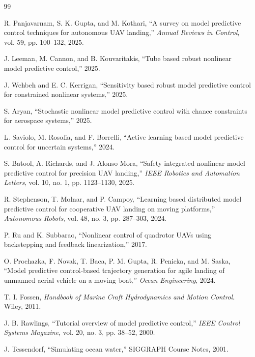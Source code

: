 \documentclass[12pt,a4paper]{report}
\begin{document}
\begin{thebibliography}{99}

R. Panjavarnam, S. K. Gupta, and M. Kothari,
``A survey on model predictive control techniques for autonomous UAV landing,''
\emph{Annual Reviews in Control}, vol. 59, pp. 100--132, 2025.

J. Leeman, M. Cannon, and B. Kouvaritakis,
``Tube based robust nonlinear model predictive control,''
2025.

J. Wehbeh and E. C. Kerrigan,
``Sensitivity based robust model predictive control for constrained nonlinear systems,''
2025.

S. Aryan,
``Stochastic nonlinear model predictive control with chance constraints for aerospace systems,''
2025.

L. Saviolo, M. Rosolia, and F. Borrelli,
``Active learning based model predictive control for uncertain systems,''
2024.

S. Batool, A. Richards, and J. Alonso-Mora,
``Safety integrated nonlinear model predictive control for precision UAV landing,''
\emph{IEEE Robotics and Automation Letters}, vol. 10, no. 1, pp. 1123--1130, 2025.

R. Stephenson, T. Molnar, and P. Campoy,
``Learning based distributed model predictive control for cooperative UAV landing on moving platforms,''
\emph{Autonomous Robots}, vol. 48, no. 3, pp. 287--303, 2024.

P. Ru and K. Subbarao,
``Nonlinear control of quadrotor UAVs using backstepping and feedback linearization,''
2017.

O. Prochazka, F. Novak, T. Baca, P. M. Gupta, R. Penicka, and M. Saska,
``Model predictive control-based trajectory generation for agile landing of unmanned aerial vehicle on a moving boat,''
\emph{Ocean Engineering}, 2024.

T. I. Fossen,
\emph{Handbook of Marine Craft Hydrodynamics and Motion Control}.
Wiley, 2011.

J. B. Rawlings,
``Tutorial overview of model predictive control,''
\emph{IEEE Control Systems Magazine}, vol. 20, no. 3, pp. 38--52, 2000.

J. Tessendorf,
``Simulating ocean water,''
SIGGRAPH Course Notes, 2001.

\end{thebibliography}
\end{document}
